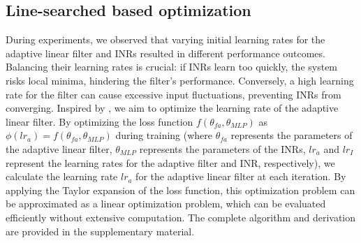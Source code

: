 \subsection{Line-searched based optimization}

During experiments, we observed that varying initial learning rates for the adaptive linear filter and INRs resulted in different performance outcomes. Balancing their learning rates is crucial: if INRs learn too quickly, the system risks local minima, hindering the filter's performance. Conversely, a high learning rate for the filter can cause excessive input fluctuations, preventing INRs from converging. Inspired by \citet{hao2021adaptive}, we aim to optimize the learning rate of the adaptive linear filter. By optimizing the loss function $f(\theta_{fa}, \theta_{MLP})$ as $\phi(lr_a) = f(\theta_{fa},  \theta_{MLP})$ during training (where $\theta_{fa}$ represents the parameters of the adaptive linear filter, $\theta_{MLP}$ represents the parameters of the INRs, $lr_a$ and $lr_I$ represent the learning rates for the adaptive filter and INR, respectively), we calculate the learning rate $lr_a$ for the adaptive linear filter at each iteration.
%
By applying the Taylor expansion of the loss function, this optimization problem can be approximated as a linear optimization problem, which can be evaluated efficiently without extensive computation. The complete algorithm and derivation are provided in the supplementary material. 


